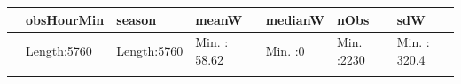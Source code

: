 \documentclass[]{article}
\begin{document}
\begin{longtable}[]{@{}lllllll@{}}
\toprule
\begin{minipage}[b]{0.03\columnwidth}\raggedright\strut
\strut
\end{minipage} & \begin{minipage}[b]{0.14\columnwidth}\raggedright\strut
obsHourMin\strut
\end{minipage} & \begin{minipage}[b]{0.15\columnwidth}\raggedright\strut
season\strut
\end{minipage} & \begin{minipage}[b]{0.13\columnwidth}\raggedright\strut
meanW\strut
\end{minipage} & \begin{minipage}[b]{0.10\columnwidth}\raggedright\strut
medianW\strut
\end{minipage} & \begin{minipage}[b]{0.12\columnwidth}\raggedright\strut
nObs\strut
\end{minipage} & \begin{minipage}[b]{0.13\columnwidth}\raggedright\strut
sdW\strut
\end{minipage}\tabularnewline
\midrule
\endhead
\begin{minipage}[t]{0.03\columnwidth}\raggedright\strut
\strut
\end{minipage} & \begin{minipage}[t]{0.14\columnwidth}\raggedright\strut
Length:5760\strut
\end{minipage} & \begin{minipage}[t]{0.15\columnwidth}\raggedright\strut
Length:5760\strut
\end{minipage} & \begin{minipage}[t]{0.13\columnwidth}\raggedright\strut
Min. : 58.62\strut
\end{minipage} & \begin{minipage}[t]{0.10\columnwidth}\raggedright\strut
Min. :0\strut
\end{minipage} & \begin{minipage}[t]{0.12\columnwidth}\raggedright\strut
Min. :2230\strut
\end{minipage} & \begin{minipage}[t]{0.13\columnwidth}\raggedright\strut
Min. : 320.4\strut
\end{minipage}\tabularnewline
\begin{minipage}[t]{0.03\columnwidth}\raggedright\strut
\strut
\end{minipage} & \begin{minipage}[t]{0.14\columnwidth}\raggedright\strut

\end{minipage}
\end{longtable}
\end{document}
